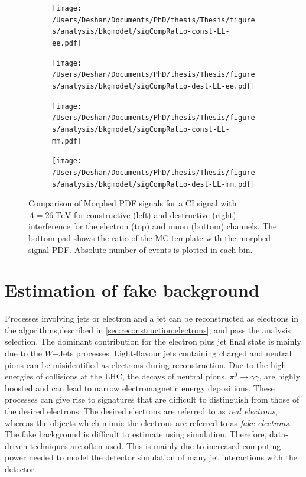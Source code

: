 \begin{figure}[h!]
    \centering
    \begin{subfigure}[b]{0.49\textwidth}
        \centering
        \texttt{[image: /Users/Deshan/Documents/PhD/thesis/Thesis/figures/analysis/bkgmodel/sigCompRatio-const-LL-ee.pdf]}
        \label{fig:bkgmodel:ratioMorphee1}
    \end{subfigure}
    \begin{subfigure}[b]{0.49\textwidth}
        \centering
        \texttt{[image: /Users/Deshan/Documents/PhD/thesis/Thesis/figures/analysis/bkgmodel/sigCompRatio-dest-LL-ee.pdf]}
        \label{fig:bkgmodel:ratioMorphee2}
    \end{subfigure}
    \begin{subfigure}[b]{0.49\textwidth}
        \centering
        \texttt{[image: /Users/Deshan/Documents/PhD/thesis/Thesis/figures/analysis/bkgmodel/sigCompRatio-const-LL-mm.pdf]}
        \label{fig:bkgmodel:ratioMorphmm1}
    \end{subfigure}
    \begin{subfigure}[b]{0.49\textwidth}
        \centering
        \texttt{[image: /Users/Deshan/Documents/PhD/thesis/Thesis/figures/analysis/bkgmodel/sigCompRatio-dest-LL-mm.pdf]}
        \label{fig:bkgmodel:ratioMorphmm2}
    \end{subfigure}
    \caption[Comparison of morphed signal PDF with generated signal template]{Comparison of Morphed PDF signals for a CI signal with $\Lambda = \SI{26}{\tera\electronvolt}$ for constructive (left) and destructive (right) interference for the electron (top) and muon (bottom) channels. The bottom pad shows the ratio of the MC template with the morphed signal PDF. Absolute number of events is plotted in each bin.}
    \label{fig:bkgmodel:ratioMorph}
\end{figure}

\section{Estimation of fake background}\label{sec:datamc:fakes}
Processes involving jets or electron and a jet can be reconstructed as electrons in the algorithms,described in \cref{sec:reconstruction:electrons}, and pass the analysis selection. The dominant contribution for the electron plus jet final state is mainly due to the $W$+Jets processes. Light-flavour jets containing charged and neutral pions can be misidentified as electrons during reconstruction. Due to the high energies of collisions at the LHC, the decays of neutral pions, $\pi^0 \rightarrow \gamma\gamma$, are highly boosted and can lead to narrow electromagnetic energy depositions. These processes can give rise to signatures that are difficult to distinguish from those of the desired electrons. The desired electrons are referred to as \emph{real electrons}, whereas the objects which mimic the electrons are referred to as \emph{fake electrons}. The fake background is difficult to estimate using simulation. Therefore, data-driven techniques are often used. This is mainly due to increased computing power needed to model the detector simulation of many jet interactions with the detector. 

